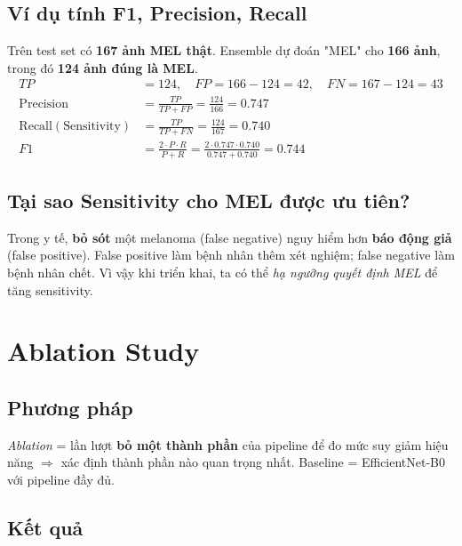 \documentclass[11pt,a4paper]{article}
\begin{document}
\subsection{Ví dụ tính F1, Precision, Recall}

\begin{example}
Trên test set có \textbf{167 ảnh MEL thật}. Ensemble dự đoán "MEL" cho \textbf{166 ảnh}, trong đó \textbf{124 ảnh đúng là MEL}.
\begin{align*}
  TP &= 124, \quad FP = 166 - 124 = 42, \quad FN = 167 - 124 = 43 \\[2pt]
  \mathrm{Precision} &= \frac{TP}{TP + FP} = \frac{124}{166} = 0.747 \\[2pt]
  \mathrm{Recall (Sensitivity)} &= \frac{TP}{TP + FN} = \frac{124}{167} = 0.740 \\[2pt]
  F1 &= \frac{2 \cdot P \cdot R}{P + R} = \frac{2 \cdot 0.747 \cdot 0.740}{0.747 + 0.740} = \mathbf{0.744}
\end{align*}
\end{example}

\subsection{Tại sao Sensitivity cho MEL được ưu tiên?}

Trong y tế, \textbf{bỏ sót} một melanoma (false negative) nguy hiểm hơn \textbf{báo động giả} (false positive). False positive làm bệnh nhân thêm xét nghiệm; false negative làm bệnh nhân chết. Vì vậy khi triển khai, ta có thể \textit{hạ ngưỡng quyết định MEL} để tăng sensitivity.

\section{Ablation Study}\label{sec:ablation}

\subsection{Phương pháp}

\textit{Ablation} = lần lượt \textbf{bỏ một thành phần} của pipeline để đo mức suy giảm hiệu năng $\Rightarrow$ xác định thành phần nào quan trọng nhất. Baseline = EfficientNet-B0 với pipeline đầy đủ.

\subsection{Kết quả}
\end{document}
